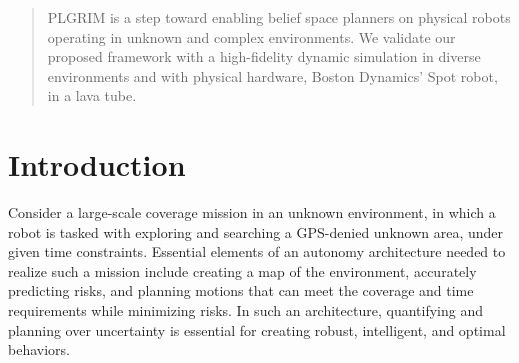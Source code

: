 \documentclass[letterpaper]{article} %
\newcommand{\phdone}[1]{} %
\begin{document}
\begin{abstract}
PLGRIM is a step toward enabling belief space planners %
on physical robots operating in unknown and complex environments. 
We validate our proposed framework with a high-fidelity dynamic simulation in diverse environments and with physical hardware, Boston Dynamics' Spot robot, in a lava tube.


\end{abstract}


\section{Introduction}

\phdone{High-level mission}
Consider a large-scale coverage mission in an unknown environment, in which a robot is tasked with exploring and searching a GPS-denied unknown area, under given time constraints. Essential elements of an autonomy architecture needed to realize such a mission include creating a map of the environment, accurately predicting risks, and planning motions that can meet the coverage and time requirements while minimizing risks.  In such an architecture, quantifying and planning over uncertainty is essential for creating robust, intelligent, and optimal behaviors.
\end{document}
